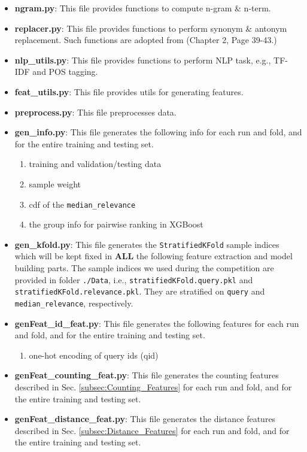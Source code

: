 \documentclass[12pt]{article}
\begin{document}
\begin{itemize}
\item \textbf{ngram.py}: This file provides functions to compute n-gram \& n-term.
\item \textbf{replacer.py}: This file provides functions to perform synonym \& antonym replacement. Such functions are adopted from \cite{NLTK_Cookbook} (Chapter 2, Page 39-43.)
\item \textbf{nlp\_utils.py}: This file provides functions to perform NLP task, e.g., TF-IDF and POS tagging.
\item \textbf{feat\_utils.py}: This file provides utils for generating features.
\item \textbf{preprocess.py}: This file preprocesses data.
\item \textbf{gen\_info.py}: This file generates the following info for each run and fold, and for the entire training and testing set.
        \begin{enumerate}
            \item training and validation/testing data
            \item sample weight
            \item cdf of the \texttt{median\_relevance}
            \item the group info for pairwise ranking in XGBoost
        \end{enumerate}
\item \textbf{gen\_kfold.py}: This file generates the \texttt{StratifiedKFold} sample indices which will be kept fixed in \textbf{ALL} the following feature extraction and model building parts. The sample indices we used during the competition are provided in folder \texttt{./Data}, i.e., \texttt{stratifiedKFold.query.pkl} and \texttt{stratifiedKFold.relevance.pkl}. They are stratified on \texttt{query} and \texttt{median\_relevance}, respectively.
\item \textbf{genFeat\_id\_feat.py}: This file generates the following features for each run and fold, and for the entire training and testing set.
    \begin{enumerate}
    \item one-hot encoding of query ids (qid)
    \end{enumerate}
\item \textbf{genFeat\_counting\_feat.py}: This file generates the counting features described in Sec. \ref{subsec:Counting_Features} for each run and fold, and for the entire training and testing set.
\item \textbf{genFeat\_distance\_feat.py}: This file generates the distance features described in Sec. \ref{subsec:Distance_Features} for each run and fold, and for the entire training and testing set.

\end{itemize}
\end{document}
